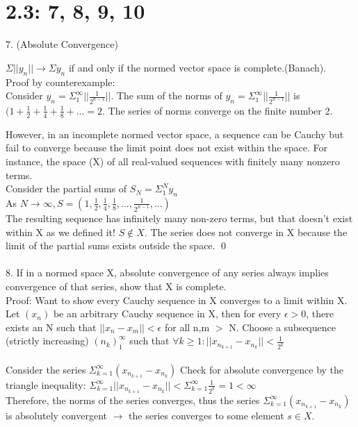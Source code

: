 \documentclass{article}
\begin{document}
\section{2.3: 7, 8, 9, 10}

7. (Absolute Convergence) 

$\Sigma||y_n||  \to \Sigma y_n$ if and only if the normed vector space is complete.(Banach). \\

Proof by counterexample: \\
Consider $y_n =\Sigma_{1}^\infty||\frac{1}{2^{n-1}}||$. The sum of the norms of $y_n =\Sigma_{1}^\infty||\frac{1}{2^{n-1}}||$ is $(1+\frac{1}{2} + \frac{1}{4} + \frac{1}{8}+ ...=2$. The series of norms converge on the finite number 2. 

However, in an incomplete normed vector space, a sequence can be Cauchy  but fail to converge because the limit point does not exist within the space. For instance, the space (X) of all real-valued sequences with finitely many nonzero terms.
\\
Consider the partial sums of $S_N = \Sigma_1^N y_n$\\
As $N \to \infty, S =(1,\frac{1}{2},\frac{1}{4}, \frac{1}{8}, ..., \frac{1}{2^{n-1}}, ...)$ \\
The resulting sequence has infinitely many non-zero terms, but that doesn't exist within X as we defined it! $S \notin X$. The series does not converge in X because the limit of the partial sums exists outside the space. \qed
\\
\\
8. If in a normed space X, absolute convergence of any series always 
implies convergence of that series, show that X is complete.
\\
Proof: Want to show every Cauchy sequence in X converges to a limit within X. \\
Let $(x_n)$ be an arbitrary Cauchy sequence in X, then for every $\epsilon > 0$, there exists an N such that $||x_n - x_m|| < \epsilon$ for all n,m $>$ N. Choose a subsequence (strictly increasing) ${(n_k)}_1^\infty$ such that $\forall k \geq 1: ||x_{n_{k+1}} - x_{n_k}|| < \frac{1}{2^k}$
\\\\
Consider the series $\Sigma_{k=1}^\infty (x_{n_{k+1}} - x_{n_k})$
Check for absolute convergence by the triangle inequality: 
$\Sigma_{k=1}^\infty ||x_{n_{k+1}} - x_{n_k}|| < \Sigma_{k=1}^\infty \frac{1}{2^k} = 1 < \infty$
\\
Therefore, the norms of the series converges, thus the series $\Sigma_{k=1}^\infty (x_{n_{k+1}} - x_{n_k})$ is absolutely convergent $\to$ the series converges to some element $s \in X$.
\end{document}
